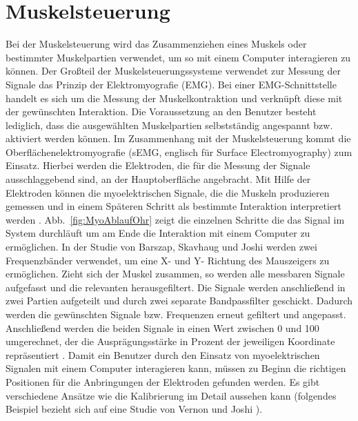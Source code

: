 \section{Muskelsteuerung}

Bei der Muskelsteuerung wird das Zusammenziehen eines Muskels oder bestimmter Muskelpartien verwendet, um so mit einem Computer interagieren zu können.
\newline \newline
Der Großteil der Muskelsteuerungssysteme verwendet zur Messung der Signale das Prinzip der Elektromyografie (EMG). Bei einer EMG-Schnittstelle handelt es sich um die Messung der Muskelkontraktion und verknüpft diese mit der gewünschten Interaktion. Die Voraussetzung an den Benutzer besteht lediglich, dass die ausgewählten Muskelpartien selbstständig angespannt bzw. aktiviert werden können. Im Zusammenhang mit der Muskelsteuerung kommt die Oberflächenelektromyografie (sEMG, englisch für Surface Electromyography) zum Einsatz. Hierbei werden die Elektroden, die für die Messung der Signale ausschlaggebend sind, an der Hauptoberfläche angebracht. Mit Hilfe der Elektroden können die myoelektrischen Signale, die die Muskeln produzieren gemessen und in einem Späteren Schritt als bestimmte Interaktion interpretiert werden \cite{EmgDefinition}.
\newline \newline
Abb.~\ref{fig:MyoAblaufOhr} zeigt die einzelnen Schritte die das Signal im System durchläuft um am Ende die Interaktion mit einem Computer zu ermöglichen. In der Studie von Barszap, Skavhaug und Joshi \cite{MyoOhr} werden zwei Frequenzbänder verwendet, um eine X- und Y- Richtung des Mauszeigers zu ermöglichen. Zieht sich der Muskel zusammen, so werden alle messbaren Signale aufgefasst und die relevanten herausgefiltert. Die Signale werden anschließend in zwei Partien aufgeteilt und durch zwei separate Bandpassfilter geschickt. \newline
Dadurch werden die gewünschten Signale bzw. Frequenzen erneut gefiltert und angepasst. Anschließend werden die beiden Signale in einen Wert zwischen 0 und 100 umgerechnet, der die Ausprägungsstärke in Prozent der jeweiligen Koordinate repräsentiert \cite{MyoOhr}.
\newline \newline
Damit ein Benutzer durch den Einsatz von myoelektrischen Signalen mit einem Computer interagieren kann, müssen zu Beginn die richtigen Positionen für die Anbringungen der Elektroden gefunden werden.  \newline \newline Es gibt verschiedene Ansätze wie die Kalibrierung im Detail aussehen kann (folgendes Beispiel bezieht sich auf eine Studie von Vernon und Joshi \cite{MyoTraining}).

